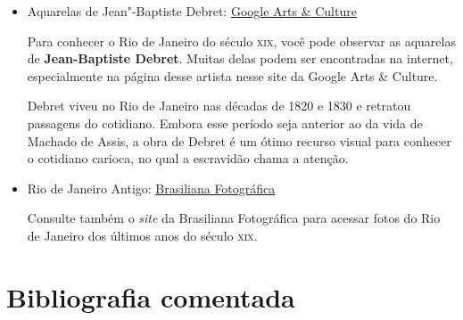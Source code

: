 \documentclass[11pt]{extarticle}
\begin{document}
\begin{itemize}

\item Aquarelas de Jean"-Baptiste Debret:
\href{https://artsandculture.google.com/entity/jean-baptiste-debret/m049vrh}{Google Arts \& Culture}

Para conhecer o Rio de Janeiro do século \textsc{xix}, você pode observar as
aquarelas de \textbf{Jean-Baptiste Debret}. Muitas delas podem ser
encontradas na internet, especialmente na página desse artista nesse site da Google Arts \& Culture.

Debret viveu no Rio de Janeiro nas décadas de 1820 e 1830 e
retratou passagens do cotidiano. Embora esse período seja anterior ao da
vida de Machado de Assis, a obra de Debret é um ótimo recurso visual para
conhecer o cotidiano carioca, no qual a escravidão chama a atenção.

\item Rio de Janeiro Antigo: \href{http://brasilianafotografica.bn.br}{Brasiliana Fotográfica}

Consulte também o \emph{site} da Brasiliana Fotográfica para acessar fotos do Rio de
Janeiro dos últimos anos do século \textsc{xix}.

\end{itemize}


\section{Bibliografia comentada}
\end{document}
